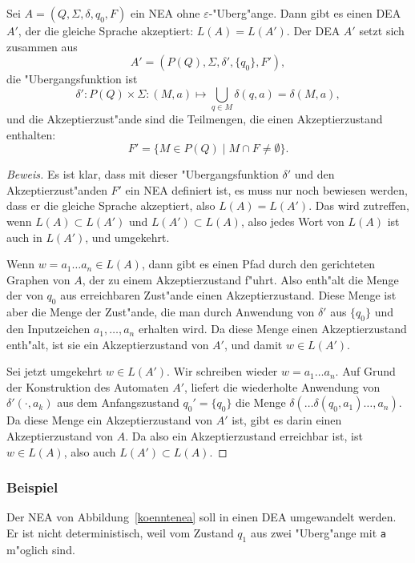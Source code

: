 \begin{satz}
\label{satz_neadea_eps}
Sei $A=(Q,\Sigma,\delta,q_0,F)$ ein NEA ohne $\varepsilon$-"Uberg"ange.
Dann gibt es einen DEA $A'$, der die gleiche Sprache akzeptiert: $L(A)=L(A')$.
Der DEA $A'$ setzt sich zusammen aus
\[
A'=
(P(Q), \Sigma, \delta', \{q_0\}, F'),
\]
die "Ubergangsfunktion ist
\[
\delta'\colon P(Q)\times \Sigma: (M, a)\mapsto \bigcup_{q\in M} \delta(q,a)
=\delta(M,a),
\]
und die Akzeptierzust"ande sind die Teilmengen, die einen Akzeptierzustand
enthalten:
\[
F'=\{M\in P(Q)\;|\;M\cap F\ne \emptyset\}.
\]
\end{satz}
\begin{proof}[Beweis]
Es ist klar, dass mit dieser "Ubergangsfunktion $\delta'$ und den
Akzeptierzust"anden $F'$ ein NEA definiert ist, es muss nur noch
bewiesen werden, dass er die gleiche Sprache akzeptiert, also
$L(A)=L(A')$. Das wird zutreffen, wenn $L(A)\subset L(A')$ und
$L(A')\subset L(A)$, also jedes Wort von $L(A)$ ist auch in $L(A')$,
und umgekehrt.

Wenn $w=a_1\dots a_n\in L(A)$, dann gibt es einen Pfad durch den gerichteten
Graphen von $A$, der zu einem Akzeptierzustand f"uhrt. Also enth"alt
die Menge der von $q_0$ aus erreichbaren Zust"ande einen Akzeptierzustand.
Diese Menge ist aber die Menge der Zust"ande, die man durch Anwendung
von $\delta'$ aus $\{q_0\}$ und den Inputzeichen $a_1,\dots,a_n$ erhalten
wird. Da diese Menge einen Akzeptierzustand enth"alt, ist sie ein
Akzeptierzustand von $A'$, und damit $w\in L(A')$.

Sei jetzt umgekehrt $w\in L(A')$. Wir schreiben wieder $w=a_1\dots a_n$.
Auf Grund der Konstruktion des Automaten $A'$, liefert die wiederholte
Anwendung von $\delta'(\cdot, a_k)$ aus dem Anfangszustand $q_0'=\{q_0\}$
die Menge $\delta(\dots\delta(q_0, a_1)\dots ,a_n)$. Da diese Menge ein
Akzeptierzustand von $A'$ ist, gibt es darin einen Akzeptierzustand
von $A$. Da also ein Akzeptierzustand erreichbar ist, ist $w\in L(A)$,
also auch $L(A')\subset L(A)$.
\end{proof}

\subsubsection{Beispiel}
Der NEA von Abbildung~\ref{koenntenea}
soll in einen DEA umgewandelt werden. Er ist nicht deterministisch,
weil vom Zustand $q_1$ aus zwei "Uberg"ange mit {\tt a} m"oglich sind.

